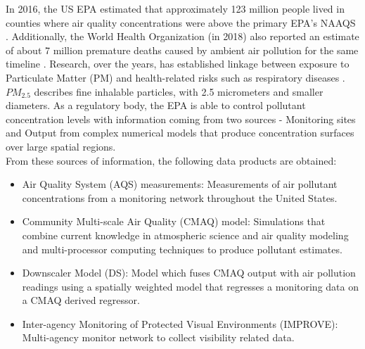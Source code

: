 \documentclass[10pt]{article}
\begin{document}
\justify
In 2016, the US EPA estimated that approximately 123 million people lived in 
counties where air quality concentrations were above the primary EPA's NAAQS \cite{EPAAir}.  Additionally, the World Health Organization (in 2018) also reported an estimate of about 7 million premature deaths caused by ambient air pollution for the same timeline \cite{WhoAir}.  Research, over the years, has established linkage between exposure to Particulate Matter (PM) and health-related risks such as respiratory diseases \cite{schwartz1996air, braga2001lag, dominici2006fine}.  $PM_{2.5}$ describes fine inhalable particles, with 2.5 micrometers and smaller diameters.  As a regulatory body, the EPA is able to control pollutant concentration levels with information coming from two sources - Monitoring sites and Output from complex numerical models that produce concentration surfaces over large spatial regions.\\
\vspace{-1.5em}
\justify
From these sources of information, the following data products are obtained:
\begin{itemize}
	\vspace{-0.5em}
	\item Air Quality System (AQS) measurements: Measurements of air pollutant concentrations from a monitoring network throughout the United States.
	\vspace{-0.5em}
	\item Community Multi-scale Air Quality (CMAQ) model: Simulations that combine current knowledge in atmospheric science and air quality modeling and multi-processor computing techniques to produce pollutant estimates.
	\vspace{-0.5em}
	\item Downscaler Model (DS): Model which fuses CMAQ output with air pollution readings using a spatially weighted model that regresses a monitoring data on a CMAQ derived regressor.
	\vspace{-0.5em}
	\item Inter-agency Monitoring of Protected Visual Environments (IMPROVE): Multi-agency monitor network to collect visibility related data.
\end{itemize}
\end{document}
